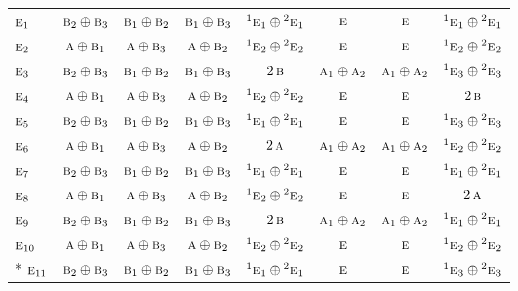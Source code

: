 \documentclass[10pt,a4paper]{article}
\numberwithin{equation}{section}
\newcommand{\irr}[1]{\text{\normalfont\scshape #1}}
\newcommand{\conjpair}[1]{{}^{#1}}
\begin{document}
{\begin{longtable}{@{}lccccccc@{}}
$\irr{e}_{1}$ & $\irr{b}_{2}\oplus \irr{b}_{3}$ & $\irr{b}_{1}\oplus \irr{b}_{2}$ & $\irr{b}_{1}\oplus \irr{b}_{3}$ & $\conjpair{1}\irr{e}_{1}\oplus \conjpair{2}\irr{e}_{1}$ & $\irr{e}$ & $\irr{e}$ & $\conjpair{1}\irr{e}_{1}\oplus \conjpair{2}\irr{e}_{1}$\\
$\irr{e}_{2}$ & $\irr{a}\oplus \irr{b}_{1}$ & $\irr{a}\oplus \irr{b}_{3}$ & $\irr{a}\oplus \irr{b}_{2}$ & $\conjpair{1}\irr{e}_{2}\oplus \conjpair{2}\irr{e}_{2}$ & $\irr{e}$ & $\irr{e}$ & $\conjpair{1}\irr{e}_{2}\oplus \conjpair{2}\irr{e}_{2}$\\
$\irr{e}_{3}$ & $\irr{b}_{2}\oplus \irr{b}_{3}$ & $\irr{b}_{1}\oplus \irr{b}_{2}$ & $\irr{b}_{1}\oplus \irr{b}_{3}$ & $2\,\irr{b}$ & $\irr{a}_{1}\oplus \irr{a}_{2}$ & $\irr{a}_{1}\oplus \irr{a}_{2}$ & $\conjpair{1}\irr{e}_{3}\oplus \conjpair{2}\irr{e}_{3}$\\
$\irr{e}_{4}$ & $\irr{a}\oplus \irr{b}_{1}$ & $\irr{a}\oplus \irr{b}_{3}$ & $\irr{a}\oplus \irr{b}_{2}$ & $\conjpair{1}\irr{e}_{2}\oplus \conjpair{2}\irr{e}_{2}$ & $\irr{e}$ & $\irr{e}$ & $2\,\irr{b}$\\
$\irr{e}_{5}$ & $\irr{b}_{2}\oplus \irr{b}_{3}$ & $\irr{b}_{1}\oplus \irr{b}_{2}$ & $\irr{b}_{1}\oplus \irr{b}_{3}$ & $\conjpair{1}\irr{e}_{1}\oplus \conjpair{2}\irr{e}_{1}$ & $\irr{e}$ & $\irr{e}$ & $\conjpair{1}\irr{e}_{3}\oplus \conjpair{2}\irr{e}_{3}$\\
$\irr{e}_{6}$ & $\irr{a}\oplus \irr{b}_{1}$ & $\irr{a}\oplus \irr{b}_{3}$ & $\irr{a}\oplus \irr{b}_{2}$ & $2\,\irr{a}$ & $\irr{a}_{1}\oplus \irr{a}_{2}$ & $\irr{a}_{1}\oplus \irr{a}_{2}$ & $\conjpair{1}\irr{e}_{2}\oplus \conjpair{2}\irr{e}_{2}$\\
$\irr{e}_{7}$ & $\irr{b}_{2}\oplus \irr{b}_{3}$ & $\irr{b}_{1}\oplus \irr{b}_{2}$ & $\irr{b}_{1}\oplus \irr{b}_{3}$ & $\conjpair{1}\irr{e}_{1}\oplus \conjpair{2}\irr{e}_{1}$ & $\irr{e}$ & $\irr{e}$ & $\conjpair{1}\irr{e}_{1}\oplus \conjpair{2}\irr{e}_{1}$\\
$\irr{e}_{8}$ & $\irr{a}\oplus \irr{b}_{1}$ & $\irr{a}\oplus \irr{b}_{3}$ & $\irr{a}\oplus \irr{b}_{2}$ & $\conjpair{1}\irr{e}_{2}\oplus \conjpair{2}\irr{e}_{2}$ & $\irr{e}$ & $\irr{e}$ & $2\,\irr{a}$\\
$\irr{e}_{9}$ & $\irr{b}_{2}\oplus \irr{b}_{3}$ & $\irr{b}_{1}\oplus \irr{b}_{2}$ & $\irr{b}_{1}\oplus \irr{b}_{3}$ & $2\,\irr{b}$ & $\irr{a}_{1}\oplus \irr{a}_{2}$ & $\irr{a}_{1}\oplus \irr{a}_{2}$ & $\conjpair{1}\irr{e}_{1}\oplus \conjpair{2}\irr{e}_{1}$\\
$\irr{e}_{10}$ & $\irr{a}\oplus \irr{b}_{1}$ & $\irr{a}\oplus \irr{b}_{3}$ & $\irr{a}\oplus \irr{b}_{2}$ & $\conjpair{1}\irr{e}_{2}\oplus \conjpair{2}\irr{e}_{2}$ & $\irr{e}$ & $\irr{e}$ & $\conjpair{1}\irr{e}_{2}\oplus \conjpair{2}\irr{e}_{2}$\\*
$\irr{e}_{11}$ & $\irr{b}_{2}\oplus \irr{b}_{3}$ & $\irr{b}_{1}\oplus \irr{b}_{2}$ & $\irr{b}_{1}\oplus \irr{b}_{3}$ & $\conjpair{1}\irr{e}_{1}\oplus \conjpair{2}\irr{e}_{1}$ & $\irr{e}$ & $\irr{e}$ & $\conjpair{1}\irr{e}_{3}\oplus \conjpair{2}\irr{e}_{3}$\\
\bottomrule\end{longtable}}
\end{document}
